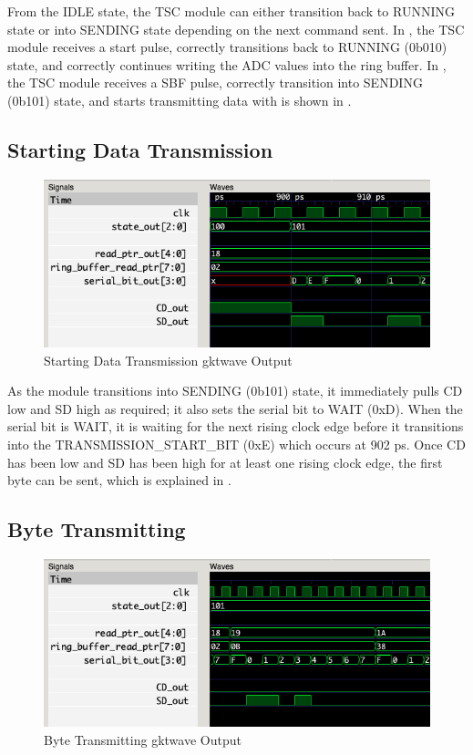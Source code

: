 From the IDLE state, the TSC module can either transition back to RUNNING state or into SENDING state depending on the next command sent.
In , the TSC module receives a start pulse, correctly transitions back to RUNNING (0b010) state, and correctly continues writing the ADC values into the ring buffer.
In , the TSC module receives a SBF pulse, correctly transition into SENDING (0b101) state, and starts transmitting data with is shown in .

\subsection{Starting Data Transmission}\label{subsec:starting-data-transmission}
\begin{figure}[H]
    \centering
    \includegraphics[width=\columnwidth]{Figures/Htransmit_start}
    \caption{Starting Data Transmission gktwave Output}
    \label{fig:testH}
\end{figure}

As the module transitions into SENDING (0b101) state, it immediately pulls CD low and SD high as required; it also sets the serial bit to WAIT (0xD).
When the serial bit is WAIT, it is waiting for the next rising clock edge before it transitions into the TRANSMISSION\_START\_BIT (0xE) which occurs at 902 ps.
Once CD has been low and SD has been high for at least one rising clock edge, the first byte can be sent, which is explained in .

\subsection{Byte Transmitting}\label{subsec:byte-transmitting}
\begin{figure}[H]
    \centering
    \includegraphics[width=\columnwidth]{Figures/Ibyte_transmit}
    \caption{Byte Transmitting gktwave Output}
    \label{fig:testI}
\end{figure}

